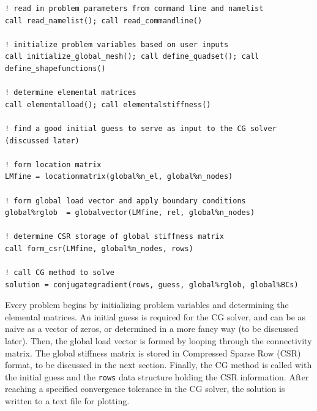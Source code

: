 \documentclass[10pt]{article}
\begin{document}
\begin{lstlisting}
! read in problem parameters from command line and namelist
call read_namelist(); call read_commandline()

! initialize problem variables based on user inputs
call initialize_global_mesh(); call define_quadset(); call define_shapefunctions()

! determine elemental matrices
call elementalload(); call elementalstiffness()

! find a good initial guess to serve as input to the CG solver (discussed later)

! form location matrix
LMfine = locationmatrix(global%n_el, global%n_nodes)

! form global load vector and apply boundary conditions
global%rglob  = globalvector(LMfine, rel, global%n_nodes)

! determine CSR storage of global stiffness matrix
call form_csr(LMfine, global%n_nodes, rows)

! call CG method to solve
solution = conjugategradient(rows, guess, global%rglob, global%BCs)
\end{lstlisting}

Every problem begins by initializing problem variables and determining the elemental matrices. An initial guess is required for the CG solver, and can be as naive as a vector of zeros, or determined in a more fancy way (to be discussed later). Then, the global load vector is formed by looping through the connectivity matrix. The global stiffness matrix is stored in Compressed Sparse Row (CSR) format, to be discussed in the next section. Finally, the CG method is called with the initial guess and the {\tt rows} data structure holding the CSR information. After reaching a specified convergence tolerance in the CG solver, the solution is written to a text file for plotting.
\end{document}
